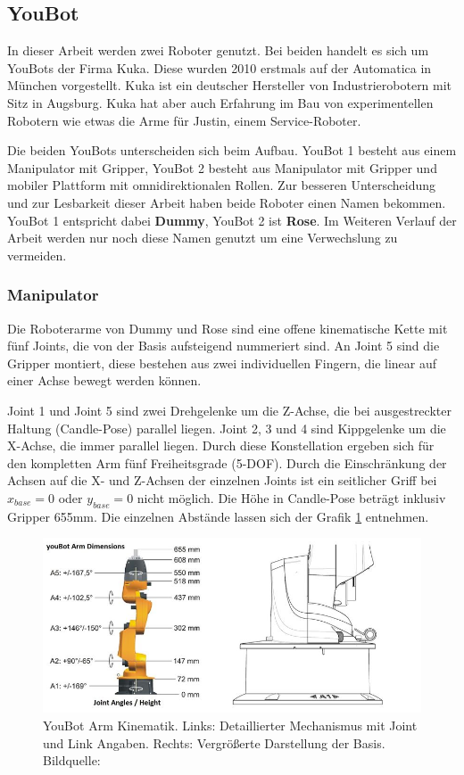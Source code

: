 \subsection{YouBot}
In dieser Arbeit werden zwei Roboter genutzt. Bei beiden handelt es sich um YouBots der Firma Kuka. Diese wurden 2010 erstmals auf der Automatica in München vorgestellt. Kuka ist ein deutscher Hersteller von Industrierobotern mit Sitz in Augsburg. Kuka hat aber auch Erfahrung im Bau von experimentellen Robotern wie etwas die Arme für Justin, einem Service-Roboter.

Die beiden YouBots unterscheiden sich beim Aufbau. YouBot 1 besteht aus einem Manipulator mit Gripper, YouBot 2 besteht aus Manipulator mit Gripper und mobiler Plattform mit omnidirektionalen Rollen. Zur besseren Unterscheidung und zur Lesbarkeit dieser Arbeit haben beide Roboter einen Namen bekommen. YouBot 1 entspricht dabei \textbf{Dummy}, YouBot 2 ist \textbf{Rose}. Im Weiteren Verlauf der Arbeit werden nur noch diese Namen genutzt um eine Verwechslung zu vermeiden.


\subsubsection{Manipulator}
 Die Roboterarme von Dummy und Rose sind eine offene kinematische Kette mit fünf Joints, die von der Basis aufsteigend nummeriert sind. An Joint 5 sind die Gripper montiert, diese bestehen aus zwei individuellen Fingern, die linear auf einer Achse bewegt werden können.

Joint 1 und Joint 5 sind zwei Drehgelenke um die Z-Achse, die bei ausgestreckter Haltung (Candle-Pose) parallel liegen. Joint 2, 3 und 4 sind Kippgelenke um die X-Achse, die immer parallel liegen. Durch diese Konstellation ergeben sich für den kompletten Arm fünf Freiheitsgrade (5-DOF). Durch die Einschränkung der Achsen auf die X- und Z-Achsen der einzelnen Joints ist ein seitlicher Griff bei $x_{base} = 0$ oder $y_{base} = 0$ nicht möglich. Die Höhe in Candle-Pose beträgt inklusiv Gripper 655mm. Die einzelnen Abstände lassen sich der Grafik \ref{fig:basic-aufbau-youbot-kinematik} entnehmen.

\begin{figure}[H]
	\centering
	\includegraphics[scale=0.8]{fig/kukaarm_1}   
	\caption[YouBot Arm Kinematik]{YouBot Arm Kinematik. Links: Detaillierter Mechanismus mit Joint und Link Angaben. Rechts: Vergrößerte Darstellung der Basis. Bildquelle: \cite{monikaflorekjasinska2015}}
	\label{fig:basic-aufbau-youbot-kinematik}
\end{figure}



